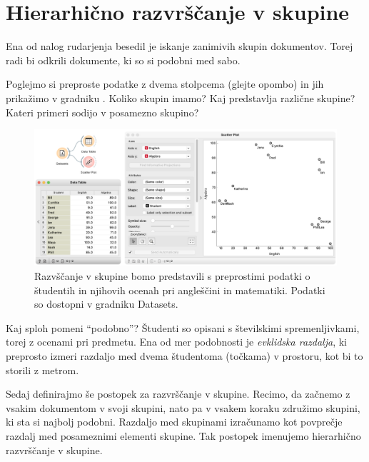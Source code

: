 \chapter{Hierarhično razvrščanje v skupine}
\label{ch:hierarhicno-razvrscanje}

Ena od nalog rudarjenja besedil je iskanje zanimivih skupin dokumentov. Torej radi bi odkrili dokumente, ki so si podobni med sabo. 

Poglejmo si preproste podatke z dvema stolpcema (glejte opombo) in jih prikažimo v gradniku . Koliko skupin imamo? Kaj predstavlja različne skupine? Kateri primeri sodijo v posamezno skupino?

\begin{figure}[h]
    \includegraphics[width=\linewidth]{grades.png}%
    \caption{Razvščanje v skupine bomo predstavili s preprostimi podatki o študentih in njihovih ocenah pri angleščini in matematiki. Podatki so dostopni v gradniku Datasets.}
    \label{fig:010-grades-example}
\end{figure}
  
Kaj sploh pomeni ``podobno''? Študenti so opisani s številskimi spremenljivkami, torej z ocenami pri predmetu. Ena od mer podobnosti je \textit{evklidska razdalja}, ki preprosto izmeri razdaljo med dvema študentoma (točkama) v prostoru, kot bi to storili z metrom.

Sedaj definirajmo še postopek za razvrščanje v skupine. Recimo, da začnemo z vsakim dokumentom v svoji skupini, nato pa v vsakem koraku združimo skupini, ki sta si najbolj podobni. Razdaljo med skupinami izračunamo kot povprečje razdalj med posameznimi elementi skupine. Tak postopek imenujemo hierarhično razvrščanje v skupine.

